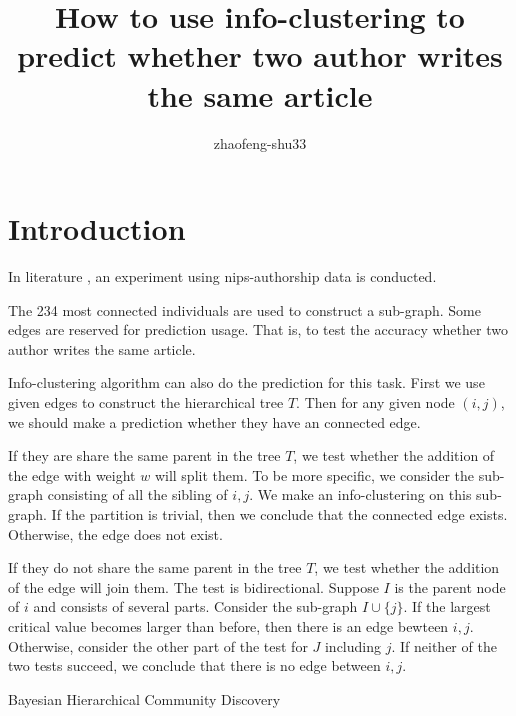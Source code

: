 \documentclass{article}
\title{How to use info-clustering to predict whether two author writes the same article}
\author{zhaofeng-shu33 }
\begin{document}
\maketitle

\section{Introduction}
In literature \cite{bhcd}, an experiment using nips-authorship data is conducted.

The 234 most connected individuals are used to construct a sub-graph. Some edges are reserved for prediction usage. That is, to test the accuracy whether two author writes the same article.

Info-clustering algorithm can also do the prediction for this task. First we use given edges to construct the hierarchical tree $T$. Then for any given node $(i,j)$, we should make a prediction whether they have an connected edge.

If they are share the same parent in the tree $T$, we test whether the addition of the edge with weight $w$ will split them. To be more specific, we consider the sub-graph consisting of all the sibling of $i,j$. We make an info-clustering on this sub-graph. If the partition is trivial, then we conclude that the connected edge exists. Otherwise, the edge does not exist.

If they do not share the same parent in the tree $T$, we test whether the addition of the edge will join them. The test is bidirectional. Suppose $I$ is the parent node of $i$ and consists of several parts. Consider the sub-graph $I \cup \{j\}$. If the largest critical value becomes larger than before, then there is an edge bewteen $i,j$. Otherwise, consider the other part of the test for $J$ including $j$. If neither of the two tests succeed, we conclude that there is no edge between $i,j$.

\begin{thebibliography}{9}
 Bayesian Hierarchical Community Discovery

\end{thebibliography}
\end{document}
